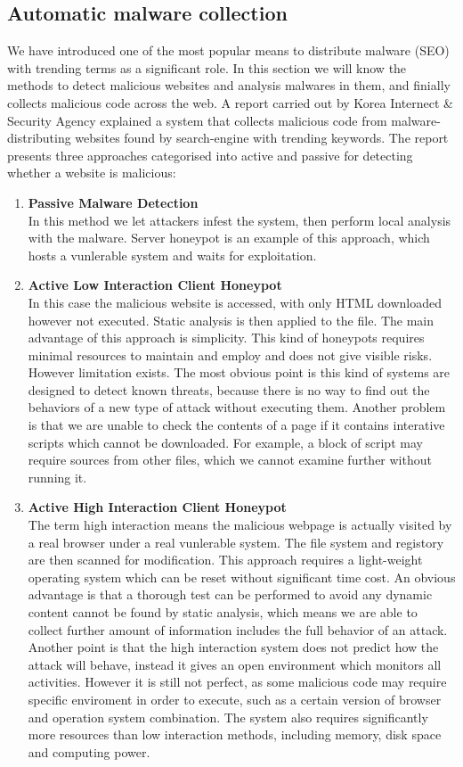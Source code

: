 \subsection{Automatic malware collection}
We have introduced one of the most popular means to distribute malware (SEO) 
with trending terms as a significant role. In this section we will know the 
methods to detect malicious websites and analysis malwares in them, and 
finially collects malicious code across the web. A report carried out by Korea 
Internect \& Security Agency\cite{automalwarecollecting} explained a system 
that collects malicious code from malware-distributing websites found by 
search-engine with trending keywords. The report presents three approaches 
categorised into active and passive for detecting whether a website is 
malicious: 
\begin{enumerate}
\item 
{\bf Passive Malware Detection}\\
In this method we let attackers infest the system, then perform local analysis 
with the malware. Server honeypot is an example of this approach, which hosts 
a vunlerable system and waits for exploitation.   
\item
{\bf Active Low Interaction Client Honeypot}\\
In this case the malicious website is accessed, with only HTML downloaded 
however not executed. Static analysis is then applied to the file. The main 
advantage of this approach is simplicity. This kind of honeypots requires 
minimal resources to maintain and employ and does not give visible 
risks.\cite{honeypots}
However limitation exists. The most obvious point is this kind of systems are 
designed to detect known threats, because there is no way to find out the 
behaviors of a new type of attack without executing them. Another problem is 
that we are unable to check the contents of a page if it contains interative 
scripts which cannot be downloaded. For example, a block of script may require 
sources from other files, which we cannot examine further without running it. 
\item
{\bf Active High Interaction Client Honeypot}\\
The term high interaction means the malicious webpage is actually visited by a 
real browser under a real vunlerable system. 
The file system and registory are then scanned for modification. This approach 
requires a light-weight operating system which can be reset without 
significant time cost. An obvious advantage is that a thorough test can be 
performed to avoid any dynamic content cannot be found by static analysis, 
which means we are able to collect further amount of information includes the 
full behavior of an attack. Another point is that the high interaction system 
does not predict how the attack will behave, instead it gives an open 
environment which monitors all activities.\cite{honeypots}
However it is still not perfect, as some malicious code may require specific 
enviroment in order to execute, such as a certain version of browser and 
operation system combination. The system also requires significantly more 
resources than low interaction methods, including memory, disk space and 
computing power. 
\end{enumerate} 
